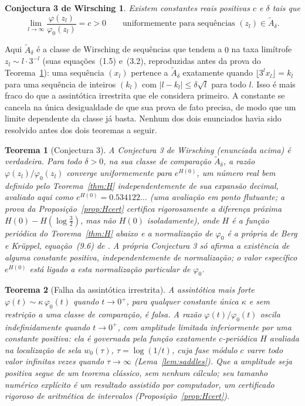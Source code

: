 \documentclass[11pt]{amsart}
\theoremstyle{plain}
\newtheorem{theorem}{Teorema}
\newtheorem*{conjecture}{Conjectura 3 de Wirsching}
\theoremstyle{definition}
\theoremstyle{remark}
\begin{document}
\begin{conjecture}
Existem constantes reais positivas $c$ e $\delta$ tais que
\[
\lim_{l\to\infty} \frac{\varphi(z_l)}{\varphi_0(z_l)} = c > 0 \qquad \text{uniformemente para
sequências } (z_l) \in \widetilde A_\delta.
\]
\end{conjecture}

Aqui $\widetilde A_\delta$ é a classe de Wirsching de sequências que tendem a $0$ na taxa limítrofe
$z_l \sim l\cdot 3^{-l}$ (suas equações~(1.5) e~(3.2), reproduzidas antes da prova do
Teorema~\ref{thm:conj3}): uma sequência $(x_l)$ pertence a $\widetilde A_\delta$ exatamente quando
$\lfloor 3^lx_l\rfloor = k_l$ para uma sequência de inteiros $(k_l)$ com $|l-k_l|\le\delta\sqrt l$
para todo $l$. Isso é mais fraco do que a assintótica irrestrita que ele considera primeiro. A
constante se cancela na única desigualdade de que sua prova de fato precisa, de modo que um limite
dependente da classe já basta. Nenhum dos dois enunciados havia sido resolvido antes dos dois
teoremas a seguir.

\begin{theorem}[Conjectura 3]
\label{thm:conj3}
A Conjectura 3 de Wirsching (enunciada acima) é verdadeira. Para todo $\delta>0$, na sua classe de
comparação $\widetilde{A}_\delta$, a razão $\varphi(z_l)/\varphi_0(z_l)$ converge uniformemente para
$e^{H(0)}$, um número real bem definido pelo Teorema~\ref{thm:H} independentemente de sua expansão
decimal, avaliado aqui como $e^{H(0)} = 0.534122\ldots$ (uma avaliação em ponto flutuante; a prova
da Proposição~\ref{prop:Hcert} certifica rigorosamente a diferença próxima
$H(0)-H(\log\tfrac32)$, mas não $H(0)$ isoladamente), onde $H$ é a função periódica do
Teorema~\ref{thm:H} abaixo e a normalização de $\varphi_0$ é a própria de Berg e Kr\"uppel,
equação~(9.6) de \cite{bergkruppel1998}. A própria Conjectura 3 só afirma a existência de alguma
constante positiva, independentemente de normalização; o valor específico $e^{H(0)}$ está ligado a
esta normalização particular de $\varphi_0$.
\end{theorem}

\begin{theorem}[Falha da assintótica irrestrita]
\label{thm:unrestricted}
A assintótica mais forte $\varphi(t) \sim \kappa\,\varphi_0(t)$ quando $t \to 0^+$, para qualquer
constante única $\kappa$ e sem restrição a uma classe de comparação, é falsa. A razão
$\varphi(t)/\varphi_0(t)$ oscila indefinidamente quando $t \to 0^+$, com amplitude limitada
inferiormente por uma constante positiva: ela é governada pela função exatamente $c$-periódica $H$
avaliada na localização de sela $w_0(\tau)$, $\tau=\log(1/t)$, cuja fase módulo $c$ varre todo valor
infinitas vezes quando $\tau\to\infty$ (Lema~\ref{lem:saddles}). Que a amplitude seja positiva segue
de um teorema clássico, sem nenhum cálculo; seu tamanho numérico explícito é um resultado assistido
por computador, um certificado rigoroso de aritmética de intervalos (Proposição~\ref{prop:Hcert}).
\end{theorem}
\end{document}
